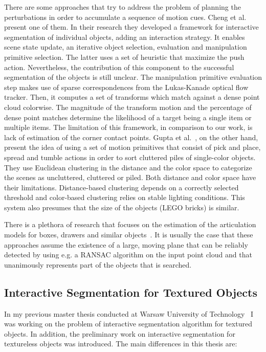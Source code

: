 There are some approaches that try to address the problem of planning the perturbations in order to accumulate a sequence of motion cues. Cheng et al.~\cite{chang11interactive} present one of them. In their research they developed a framework for interactive segmentation of individual objects, adding an interaction strategy. It enables scene state update, an iterative object selection, evaluation and manipulation primitive selection. The latter uses a set of heuristic that maximize the push action. Nevertheless, the contribution of this component to the successful segmentation of the objects is still unclear. The manipulation primitive evaluation step makes use of sparse correspondences from the Lukas-Kanade optical flow tracker. Then, it computes a set of transforms which match against a dense point cloud colorwise. The magnitude of the transform motion and the percentage of dense point matches determine the likelihood of a target being a single item or multiple items. The limitation of this framework, in comparison to our work, is lack of estimation of the corner contact points.
Gupta et al.~\cite{gupta11primitives}, on the other hand, present the idea of using a set of motion primitives that consist of pick and place, spread and tumble actions in order to sort cluttered piles of single-color objects. They use Euclidean clustering in the distance and the color space to categorize the scenes as uncluttered, cluttered or piled. Both distance and color space have their limitations. Distance-based clustering depends on a correctly selected threshold and color-based clustering relies on stable lighting conditions. This system also presumes that the size of the objects (LEGO bricks) is similar. 

There is a plethora of research that focuses on the estimation of the articulation models for boxes, drawers and similar objects~\cite{Box11Saxena,
  sturm10rss-workshop}. It is usually the case that these approaches assume the existence of a large, moving plane that can be reliably detected by using e.g. a RANSAC algorithm on the input point cloud and that  unanimously represents part of the objects that is searched.


\subsection{Interactive Segmentation for Textured Objects}
In my previous master thesis conducted at Warsaw University of Technology~\cite{polishthesis} I was working on the problem of interactive segmentation algorithm for textured objects. In addition, the preliminary work on interactive segmentation for textureless objects was introduced. The main differences in this thesis are: 


